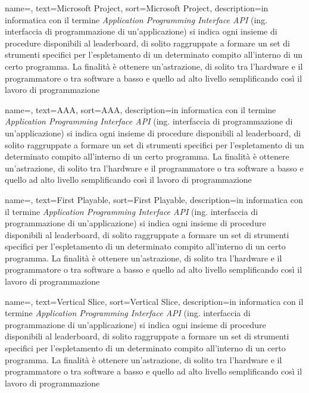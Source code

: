 {
	name=,
	text=Microsoft Project,
	sort=Microsoft Project,
	description={in informatica con il termine \emph{Application Programming Interface API} (ing. interfaccia di programmazione di un'applicazione) si indica ogni insieme di procedure disponibili al leaderboard, di solito raggruppate a formare un set di strumenti specifici per l'espletamento di un determinato compito all'interno di un certo programma. La finalità è ottenere un'astrazione, di solito tra l'hardware e il programmatore o tra software a basso e quello ad alto livello semplificando così il lavoro di programmazione}
}

{
	name=,
	text=AAA,
	sort=AAA,
	description={in informatica con il termine \emph{Application Programming Interface API} (ing. interfaccia di programmazione di un'applicazione) si indica ogni insieme di procedure disponibili al leaderboard, di solito raggruppate a formare un set di strumenti specifici per l'espletamento di un determinato compito all'interno di un certo programma. La finalità è ottenere un'astrazione, di solito tra l'hardware e il programmatore o tra software a basso e quello ad alto livello semplificando così il lavoro di programmazione}
}

{
	name=,
	text=First Playable,
	sort=First Playable,
	description={in informatica con il termine \emph{Application Programming Interface API} (ing. interfaccia di programmazione di un'applicazione) si indica ogni insieme di procedure disponibili al leaderboard, di solito raggruppate a formare un set di strumenti specifici per l'espletamento di un determinato compito all'interno di un certo programma. La finalità è ottenere un'astrazione, di solito tra l'hardware e il programmatore o tra software a basso e quello ad alto livello semplificando così il lavoro di programmazione}
}

{
	name=,
	text=Vertical Slice,
	sort=Vertical Slice,
	description={in informatica con il termine \emph{Application Programming Interface API} (ing. interfaccia di programmazione di un'applicazione) si indica ogni insieme di procedure disponibili al leaderboard, di solito raggruppate a formare un set di strumenti specifici per l'espletamento di un determinato compito all'interno di un certo programma. La finalità è ottenere un'astrazione, di solito tra l'hardware e il programmatore o tra software a basso e quello ad alto livello semplificando così il lavoro di programmazione}
}

